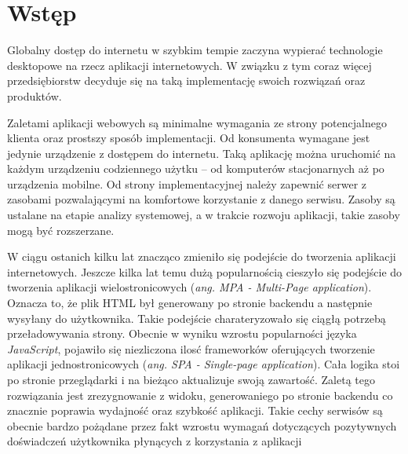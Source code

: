 \chapter{Wstęp}
Globalny dostęp do internetu w szybkim tempie zaczyna wypierać technologie desktopowe na rzecz aplikacji internetowych. W związku z tym coraz więcej przedsiębiorstw decyduje się na taką implementację swoich rozwiązań oraz produktów.

Zaletami aplikacji webowych są minimalne wymagania ze strony potencjalnego klienta oraz prostszy sposób implementacji. Od konsumenta wymagane jest jedynie urządzenie z dostępem do internetu. Taką aplikację można uruchomić na każdym urządzeniu codziennego użytku -- od komputerów stacjonarnych aż po urządzenia mobilne. Od strony implementacyjnej należy zapewnić serwer z zasobami pozwalającymi na komfortowe korzystanie z danego serwisu. Zasoby są ustalane na etapie analizy systemowej, a w trakcie rozwoju aplikacji, takie zasoby mogą być rozszerzane.

W ciągu ostanich kilku lat znacząco zmieniło się podejście do tworzenia aplikacji internetowych. Jeszcze kilka lat temu dużą popularnością cieszyło się podejście do tworzenia aplikacji wielostronicowych (\textit{ang. MPA - Multi-Page application}). Oznacza to, że plik HTML był generowany po stronie backendu a następnie wysyłany do użytkownika. Takie podejście charateryzowało się ciągłą potrzebą przeładowywania strony. Obecnie w wyniku wzrostu popularności języka \textit{JavaScript}, pojawiło się niezliczona ilosć frameworków oferujących tworzenie aplikacji jednostronicowych (\textit{ang. SPA - Single-page application}). Cała logika stoi po stronie przeglądarki i na bieżąco aktualizuje swoją zawartość. Zaletą tego rozwiązania jest zrezygnowanie z widoku, generowaniego po stronie backendu co znacznie poprawia wydajność oraz szybkość aplikacji. Takie cechy serwisów są obecnie bardzo pożądane przez fakt wzrostu wymagań dotyczących pozytywnych doświadczeń użytkownika płynących z korzystania z aplikacji




